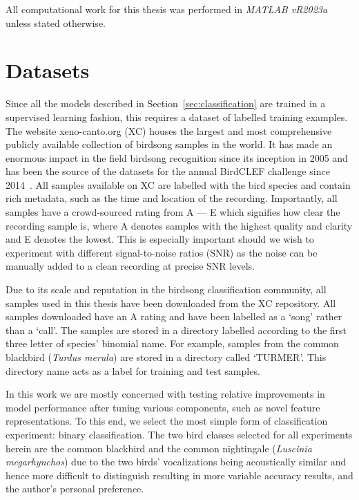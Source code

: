 All computational work for this thesis was performed in \textit{MATLAB vR2023a}
unless stated otherwise.

\section{Datasets}

Since all the models described in Section~\ref{sec:classification} are trained
in a supervised learning fashion, this requires a dataset of labelled training
examples. The website xeno-canto.org (XC) houses the largest and most
comprehensive publicly available collection of birdsong samples in the world. It
has made an enormous impact in the field birdsong recognition since its
inception in 2005 and has been the source of the datasets for the annual
BirdCLEF challenge since 2014~\cite{vellinga2015xeno}. All samples available on
XC are labelled with the bird species and contain rich metadata, such as the
time and location of the recording. Importantly, all samples have a
crowd-sourced rating from A --- E which signifies how clear the recording sample
is, where A denotes samples with the highest quality and clarity and E denotes
the lowest. This is especially important should we wish to experiment with
different signal-to-noise ratios (SNR) as the noise can be manually added to a
clean recording at precise SNR levels.

Due to its scale and reputation in the birdsong classification community, all
samples used in this thesis have been downloaded from the XC repository. All
samples downloaded have an A rating and have been labelled as a `song' rather
than a `call'. The samples are stored in a directory labelled according to the
first three letter of species' binomial name. For example, samples from the
common blackbird (\textit{Turdus merula}) are stored in a directory called
`TURMER'. This directory name acts as a label for training and test samples.

In this work we are mostly concerned with testing relative improvements in model
performance after tuning various components, such as novel feature
representations. To this end, we select the most simple form of classification
experiment: binary classification. The two bird classes selected for all
experiments herein are the common blackbird and the common nightingale
(\textit{Luscinia megarhynchos}) due to the two birds' vocalizations being
acoustically similar and hence more difficult to distinguish resulting in more
variable accuracy results, and the author's personal preference.

